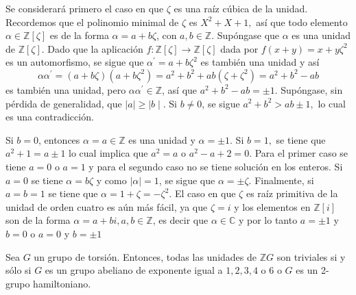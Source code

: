 \begin{proof*}
Se considerará primero el caso en que $\zeta$ es una raíz cúbica de la unidad. Recordemos que el polinomio minimal de $\zeta$ es $X^2 + X + 1,$ así que todo elemento $\alpha \in \mathds{Z}[\zeta]$ es de la forma $\alpha = a+b\zeta$, con $a,b \in \mathds{Z}$. Supóngase que $\alpha$ es una unidad de $\mathds{Z}[\zeta]$. Dado que la aplicación $f \colon \mathds{Z}[\zeta]\to \mathds{Z}[\zeta]$ dada por $f(x+y) = x+y\zeta^2$ es un automorfismo, se sigue que $\alpha^{'} = a + b\zeta^2$ es también una unidad y así \[ \alpha\alpha^{'} = (a + b\zeta)(a + b\zeta^2) = a^2 + b^2 + ab(\zeta  + \zeta^2) = a^2 + b^2 -ab \] es también una unidad, pero $\alpha\alpha^{'} \in \mathds{Z}$, así que $a^2 + b^2 -ab = \pm 1$. Supóngase, sin pérdida de generalidad, que $\mid a \mid \geq \mid b \mid$. Si $b \neq 0$, se sigue $a^2 + b^2 > ab \pm 1,$ lo cual es una contradicción. 

Si $b = 0$, entonces $\alpha = a \in \mathds{Z}$ es una unidad y $\alpha = \pm 1$. Si $b = 1,$ se tiene que $a^2 + 1 = a \pm 1$ lo cual implica que $a^2 = a$ o  $a^2-a+2 = 0$. Para el primer caso se tiene $a = 0$  o $a=1$ y para el segundo caso no se tiene solución en los enteros. Si $a=0$ se tiene $\alpha = b\zeta$ y como $\mid \alpha \mid = 1$, se sigue que $\alpha = \pm \zeta$. Finalmente, si $a = b = 1$ se tiene que $\alpha =1 + \zeta = -\zeta^2$.
El caso en que $\zeta$ es raíz primitiva de la unidad de orden cuatro es aún más fácil, ya que $\zeta = i$ y los elementos en $\mathds{Z}[i]$ son de la forma $\alpha = a + bi, a,b \in \mathds{Z}$, es decir que $\alpha \in \mathds{C}$ y por lo tanto $a = \pm 1$ y $b = 0$ o $a = 0$ y $b = \pm 1$
\end{proof*}
\begin{teorema}[Higman]\label{teo:Higman}
Sea $G$ un grupo de torsión. Entonces, todas las unidades de $\mathds{Z}G$ son triviales si y sólo si $G$ es un grupo abeliano de exponente igual a $1,2,3,4$ o $6$ o $G$ es un 2-grupo hamiltoniano. 
\end{teorema}
